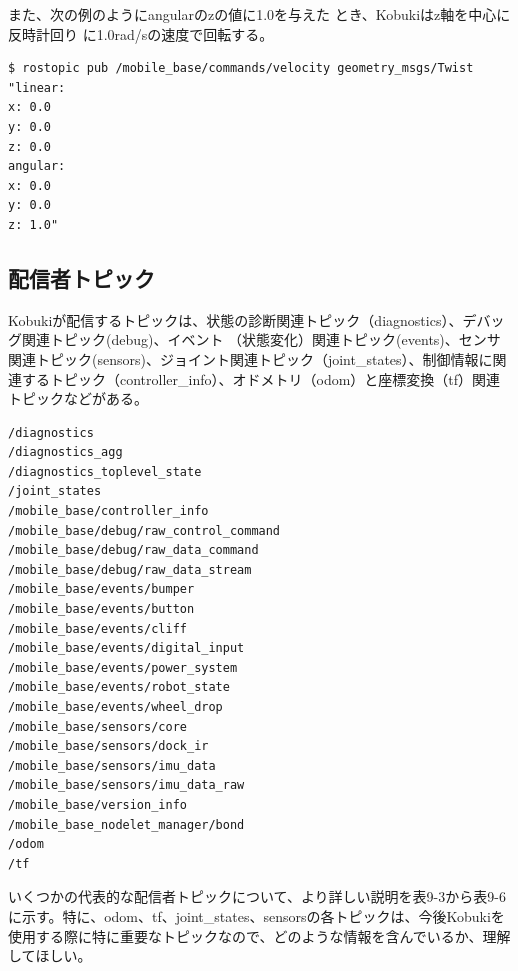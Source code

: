 \begin{itemize}
また、次の例のようにangularのzの値に1.0を与えた    とき、Kobukiはz軸を中心に反時計回り  に1.0rad/sの速度で回転する。

\begin{lstlisting}[language=ROS]
$ rostopic pub /mobile_base/commands/velocity geometry_msgs/Twist "linear:
x: 0.0
y: 0.0
z: 0.0
angular:
x: 0.0
y: 0.0
z: 1.0"
\end{lstlisting}

\subsection{配信者トピック}

Kobukiが配信するトピックは、状態の診断関連トピック（diagnostics）、デバッグ関連トピック(debug)、イベント  （状態変化）関連トピック(events)、センサ関連トピック(sensors)、ジョイント関連トピック（joint\_states）、制御情報に関連するトピック（controller\_info）、オドメトリ（odom）と座標変換（tf）関連トピックなどがある。

\begin{lstlisting}[language=ROS]
/diagnostics
/diagnostics_agg
/diagnostics_toplevel_state
/joint_states
/mobile_base/controller_info
/mobile_base/debug/raw_control_command
/mobile_base/debug/raw_data_command
/mobile_base/debug/raw_data_stream
/mobile_base/events/bumper
/mobile_base/events/button
/mobile_base/events/cliff
/mobile_base/events/digital_input
/mobile_base/events/power_system
/mobile_base/events/robot_state
/mobile_base/events/wheel_drop
/mobile_base/sensors/core
/mobile_base/sensors/dock_ir
/mobile_base/sensors/imu_data
/mobile_base/sensors/imu_data_raw
/mobile_base/version_info
/mobile_base_nodelet_manager/bond
/odom
/tf
\end{lstlisting}

いくつかの代表的な配信者トピックについて、より詳しい説明を表9-3から表9-6に示す。特に、odom、tf、joint\_states、sensorsの各トピックは、今後Kobukiを使用する際に特に重要なトピックなので、どのような情報を含んでいるか、理解してほしい。


\end{itemize}
